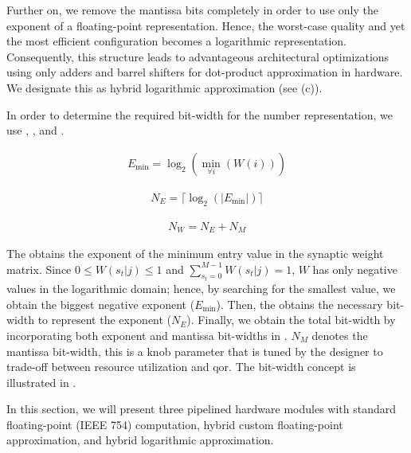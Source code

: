 Further on, we remove the mantissa bits completely in order to use only the exponent of a floating-point representation. Hence, the worst-case quality and yet the most efficient configuration becomes a logarithmic representation. Consequently, this structure leads to advantageous architectural optimizations using only adders and barrel shifters for dot-product approximation in hardware. We designate this as hybrid logarithmic approximation (see {}(c)).

In order to determine the required bit-width for the number representation, we use {}, {}, and {}.

\begin{eqnarray} \label{eq:exp_max}
E_{\min}=\log _2(\min_{\forall i}(W(i)))
\end{eqnarray}

\begin{eqnarray} \label{eq:bits_exp}
N_E=\lceil\log_2(|E_{\min}|)\rceil
\end{eqnarray}

\begin{eqnarray} \label{eq:bits_bitwidth}
N_W=N_E + N_M
\end{eqnarray}


The  obtains the exponent of the minimum entry value in the synaptic weight matrix. Since $0\le W(s_t|j)\le1$ and $\sum_{s_t=0}^{M-1}W(s_t|j)=1$, $W$ has only negative values in the logarithmic domain; hence, by searching for the smallest value, we obtain the biggest negative exponent ($E_{\min}$). Then, the {} obtains the necessary bit-width to represent the exponent ($N_E$). Finally, we obtain the total bit-width by incorporating both exponent and mantissa bit-widths in {}. $N_M$ denotes the mantissa bit-width, this is a knob parameter that is tuned by the designer to trade-off between resource utilization and \gls{qor}. The bit-width concept is illustrated in {}.

In this section, we will present three pipelined hardware modules with standard floating-point (IEEE 754) computation, hybrid custom floating-point approximation, and hybrid logarithmic approximation.

